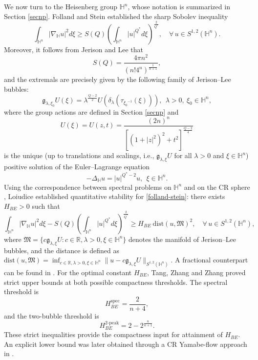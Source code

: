 \documentclass[11pt]{article}
\begin{document}
{We now turn to the Heisenberg group $\mathbb{H}^{n}$, whose notation is summarized in Section \ref{secnp}. Folland and Stein \cite{FS74} established the sharp Sobolev inequality}
\begin{equation}\label{folland-stein}
 \int_{\mathbb{H}^{n}}|\nabla_{\mathbb{H}}u|^{2}{d}\xi\geq S(Q)\left(\int_{\mathbb{H}^{n}}|u|^{Q^{\ast}}{d}\xi\right)^{\frac{2}{Q^{\ast}}},\quad \forall \, u\in S^{1,2}(\mathbb{H}^{n}).
\end{equation}
Moreover, it follows from Jerison and Lee \cite{JL88} that \[S(Q)=\frac{4\pi n^2}{(n!4^n)^{\frac{1}{n+1}}},\]
{and the extremals are precisely given by the following family of Jerison--Lee bubbles:}
\begin{equation}\label{gU}
 \mathfrak{g}_{\lambda,\xi_0}U(\xi)=\lambda^{\frac{Q-2}{2}}U(\delta_\lambda(\tau_{{\xi_0}^{-1}}(\xi))),
 ~~\lambda>0,~\xi_{0}\in\mathbb{H}^{n},
\end{equation}
{where the group actions are defined in Section \ref{secnp} and} \[U(\xi)=U(z,t)=\frac{(2n)^n}{[(1+|z|^{2})^{2}+t^{2}]^{\frac{Q-2}{4}}}\]
is the unique (up to translations and scalings, i.e., $\mathfrak{g}_{\lambda,\xi}U$ for all $\lambda>0$ and $\xi\in\mathbb{H}^{n}$)
positive solution of the Euler--Lagrange equation
\begin{equation*}
 -\Delta_{\mathbb{H}} u=|u|^{Q^{\ast}-2}u,~~\xi\in\mathbb{H}^{n}.
\end{equation*}
{Using the correspondence between spectral problems on $\mathbb{H}^{n}$ and on the CR sphere \cite{MU02}, Loiudice \cite{L05} established quantitative stability for \eqref{folland-stein}: there exists $H_{BE}>0$ such that}
\begin{equation*}
 \int_{\mathbb{H}^{n}}|\nabla_{\mathbb{H}}u|^{2}{d}\xi- S(Q)\left(\int_{\mathbb{H}^{n}}|u|^{Q^{\ast}}{d}\xi\right)^{\frac{2}{Q^{\ast}}}\geq H_{BE} ~ \mathrm{dist}(u,\mathfrak{M})^2,\quad \forall \, u\in S^{1,2}(\mathbb{H}^{n}),
\end{equation*}
 where $\mathfrak{M}=\big\{c\mathfrak{g}_{\lambda,\xi}U: c\in \mathbb{R},\lambda>0,\xi\in \mathbb{H}^n\big\}$ denotes the manifold of Jerison--Lee bubbles, and the distance is defined as $\mathrm{dist}(u,\mathfrak{M})=\inf_{c\in \mathbb{R},\lambda>0,\xi\in \mathbb{H}^n}\|u-c\mathfrak{g}_{\lambda,\xi}U\|_{S^{1,2}(\mathbb{H}^{n})}$.
 A fractional counterpart can be found in \cite{LZ15}. {For the optimal constant $H_{BE}$, Tang, Zhang and Zhang \cite{TZZ24} proved strict upper bounds at both possible compactness thresholds. The spectral threshold is}
\begin{equation*}
 H_{BE}^{\mathrm{spec}}=\frac{2}{n+4},
\end{equation*}
{and the two-bubble threshold is}
\begin{equation*}
 H_{BE}^{2\text{-peak}}=2-2^{\frac{n}{n+1}}.
\end{equation*}
{These strict inequalities provide the compactness input for attainment of $H_{BE}$. An explicit lower bound was later obtained through a CR Yamabe-flow approach in \cite{CLTW25}.}
\end{document}
